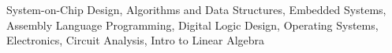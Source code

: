 System-on-Chip Design, Algorithms and Data Structures, Embedded Systems, Assembly Language Programming, Digital Logic Design, Operating Systems, Electronics, Circuit Analysis, Intro to Linear Algebra